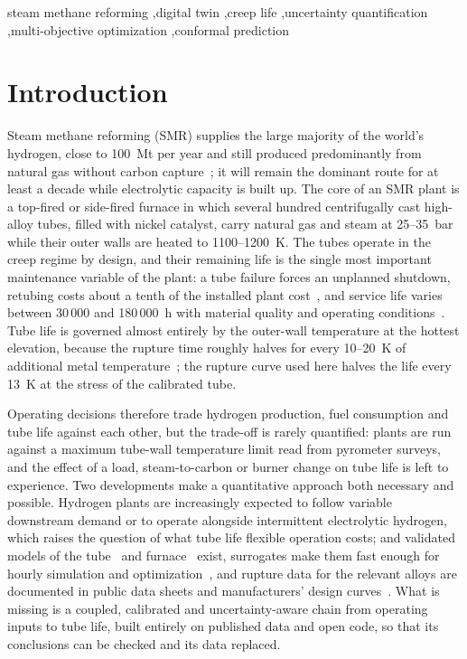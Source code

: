 \documentclass[final,3p,times]{elsarticle}
\begin{document}
\begin{frontmatter}
\begin{keyword}
steam methane reforming \sep digital twin \sep creep life \sep uncertainty quantification \sep multi-objective optimization \sep conformal prediction
\end{keyword}

\end{frontmatter}

\section{Introduction}
\label{sec:intro}

Steam methane reforming (SMR) supplies the large majority of the world's hydrogen, close to 100~Mt per year and still produced predominantly from natural gas without carbon capture~\cite{iea2024}; it will remain the dominant route for at least a decade while electrolytic capacity is built up. The core of an SMR plant is a top-fired or side-fired furnace in which several hundred centrifugally cast high-alloy tubes, filled with nickel catalyst, carry natural gas and steam at 25--35~bar while their outer walls are heated to 1100--1200~K. The tubes operate in the creep regime by design, and their remaining life is the single most important maintenance variable of the plant: a tube failure forces an unplanned shutdown, retubing costs about a tenth of the installed plant cost~\cite{latham2011}, and service life varies between 30\,000 and 180\,000~h with material quality and operating conditions~\cite{ray2003}. Tube life is governed almost entirely by the outer-wall temperature at the hottest elevation, because the rupture time roughly halves for every 10--20~K of additional metal temperature~\cite{latham2011,api530}; the rupture curve used here halves the life every 13~K at the stress of the calibrated tube.

Operating decisions therefore trade hydrogen production, fuel consumption and tube life against each other, but the trade-off is rarely quantified: plants are run against a maximum tube-wall temperature limit read from pyrometer surveys, and the effect of a load, steam-to-carbon or burner change on tube life is left to experience. Two developments make a quantitative approach both necessary and possible. Hydrogen plants are increasingly expected to follow variable downstream demand or to operate alongside intermittent electrolytic hydrogen, which raises the question of what tube life flexible operation costs; and validated models of the tube~\cite{xu1989a,xu1989b,pantoleontos2012,latham2011} and furnace~\cite{plehiers1989,zamaniyan2008} exist, surrogates make them fast enough for hourly simulation and optimization~\cite{kumar2015,jafarizadeh2024,yerimah2025,nabavi2025}, and rupture data for the relevant alloys are documented in public data sheets and manufacturers' design curves~\cite{nims16b,nims38a,yeh2021}. What is missing is a coupled, calibrated and uncertainty-aware chain from operating inputs to tube life, built entirely on published data and open code, so that its conclusions can be checked and its data replaced.
\end{document}
